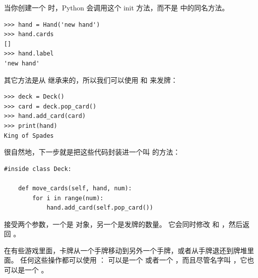 
当你创建一个  时，Python 会调用这个 init 方法，而不是  中的同名方法。

\begin{lstlisting}
>>> hand = Hand('new hand')
>>> hand.cards
[]
>>> hand.label
'new hand'
\end{lstlisting}


其它方法是从  继承来的，所以我们可以使用  和
 来发牌：

\begin{lstlisting}
>>> deck = Deck()
>>> card = deck.pop_card()
>>> hand.add_card(card)
>>> print(hand)
King of Spades
\end{lstlisting}


很自然地，下一步就是把这些代码封装进一个叫  的方法：


\begin{lstlisting}
#inside class Deck:

    def move_cards(self, hand, num):
        for i in range(num):
            hand.add_card(self.pop_card())
\end{lstlisting}


 接受两个参数，一个是  对象，另一个是发牌的数量。
它会同时修改  和  ，然后返回  。


在有些游戏里面，卡牌从一个手牌移动到另外一个手牌，或者从手牌退还到牌堆里面。
任何这些操作都可以使用  ：  可以是一个  或者一个  ，而且尽管名字叫  ，它也可以是一个  。

